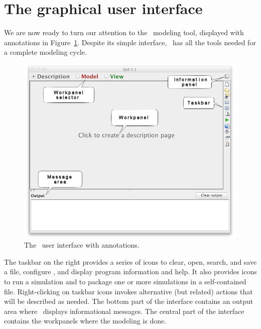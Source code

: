     \section{The graphical user interface}\label{section:01GUI}

We are now ready to turn our attention to the \ejs\ modeling tool, displayed with annotations in
Figure~\ref{fig:01Introduction/EjsInterface}. Despite its simple interface, \ejs\ has all the tools needed for a complete
modeling cycle.

\begin{figure}[htb]
  \centering
  \includegraphics[scale=\scale]{01Introduction/images/EjsInterface.png}
  \caption{The \Ejs\ user interface with annotations.}
  \label{fig:01Introduction/EjsInterface}
\end{figure}

The taskbar on the right provides a series of icons to
clear, open, search, and save a file, configure \ejs, and display program information and help. It also provides icons to run a
simulation and to package one or more simulations in a self-contained file. Right-clicking on taskbar icons invokes alternative (but related) actions that will be described as needed. The bottom part of the interface contains an output area where \ejs\ displays informational messages. The central part of the interface contains the workpanels where the modeling is done.

